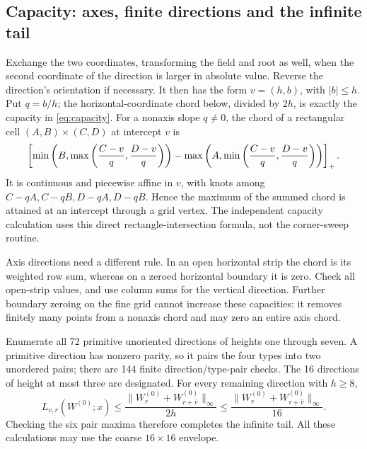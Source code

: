 \subsection{Capacity: axes, finite directions and the infinite tail}
Exchange the two coordinates, transforming the field and root as
well, when the second coordinate of the direction is larger in
absolute value. Reverse the direction's orientation if necessary.
It then has the form \(v=(h,b)\), with \(|b|\le h\). Put
\(q=b/h\); the horizontal-coordinate chord below, divided by
\(2h\), is exactly the capacity in \eqref{eq:capacity}.
For a nonaxis slope \(q\ne0\), the chord of a rectangular cell
\((A,B)\times(C,D)\) at intercept \(v\) is
\[
 \left[\min\left(B,\max\left(\frac{C-v}{q},\frac{D-v}{q}\right)\right)
 -\max\left(A,\min\left(\frac{C-v}{q},\frac{D-v}{q}\right)\right)\right]_+.
\]
It is continuous and piecewise affine in \(v\), with knots among
\(C-qA,C-qB,D-qA,D-qB\). Hence the maximum of the summed chord
is attained at an intercept through a grid vertex. The independent
capacity calculation uses this direct rectangle-intersection formula,
not the corner-sweep routine.

Axis directions need a different rule. In an open horizontal strip
the chord is its weighted row sum, whereas on a zeroed horizontal
boundary it is zero. Check all open-strip values, and use column sums
for the vertical direction. Further boundary zeroing on the fine grid
cannot increase these capacities: it removes finitely many points
from a nonaxis chord and may zero an entire axis chord.

Enumerate all 72 primitive unoriented directions of heights one
through seven. A primitive direction has nonzero parity, so it pairs
the four types into two unordered pairs; there are 144 finite
direction/type-pair checks. The 16 directions of height at most three
are designated. For every remaining direction with \(h\ge8\),
\[
 L_{v,r}(W^{(0)};x)
 \le\frac{\|W_r^{(0)}+W_{r+\bar v}^{(0)}\|_\infty}{2h}
 \le\frac{\|W_r^{(0)}+W_{r+\bar v}^{(0)}\|_\infty}{16}.
\]
Checking the six pair maxima therefore completes the infinite tail.
All these calculations may use the coarse \(16\times16\) envelope.

